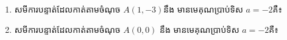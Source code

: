 \begin{enumerate}
\item សមីការបន្ទាត់ដែលកាត់តាមចំណុច $A(1,-3) $នឹង មានមេគុណប្រាប់ទិស $a=-2$គឺ៖
\begin{enumerate}[label=\alph*.]
\end{enumerate}
\item សមីការបន្ទាត់ដែលកាត់តាមចំណុច $A(0,0)$ នឹង មានមេគុណប្រាប់ទិស $a=-2$គឺ៖
\begin{enumerate}[label=\alph*.]
\end{enumerate}

\end{enumerate}

